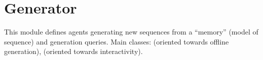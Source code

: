 \documentclass[letterpaper,10pt,english]{sphinxmanual}
\begin{document}
\begin{fulllineitems}
\label{\detokenize{index:Query.new_temporal_query_free_sequence_of_events}}
\end{fulllineitems}


\begin{fulllineitems}
\label{\detokenize{index:Query.new_temporal_query_sequence_of_events}}
\end{fulllineitems}

\label{\detokenize{index:module-Generator}}

\section{Generator}
\label{\detokenize{index:generator}}
This module defines agents generating new sequences from a “memory” (model of sequence) and generation queries.
Main classes: {\hyperref[\detokenize{index:Generator.Generator}]{}} (oriented towards offline generation), {\hyperref[\detokenize{index:Generator.GenerationHandler}]{}} (oriented towards interactivity).
\end{document}
